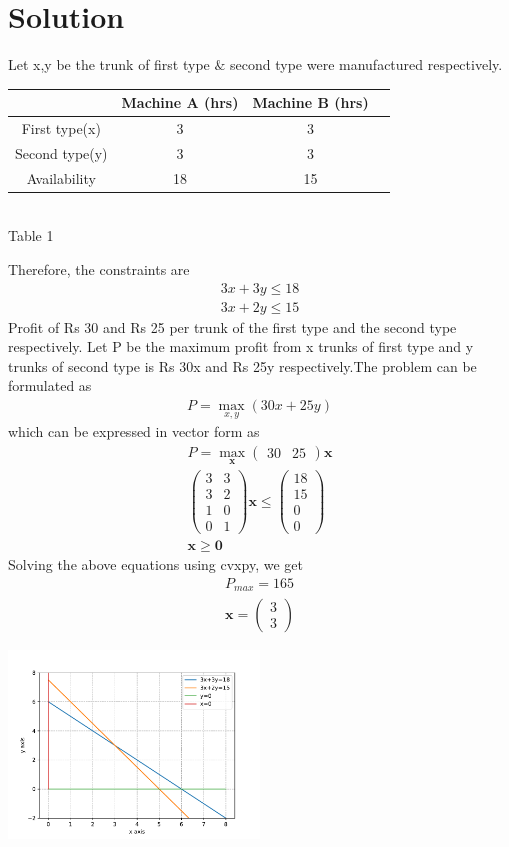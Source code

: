 \documentclass[10pt,twocolumn]{article}
\let\vec\mathbf
\newcommand{\myvec}[1]{\ensuremath{\begin{pmatrix}#1\end{pmatrix}}}
\begin{document}
\section*{\large Solution}
Let x,y be the trunk of first type $\&$ second type were manufactured respectively.
\begin{center}
    \setlength{\arrayrulewidth}{0.1mm}
	\setlength{\tabcolsep}{2pt}
	\renewcommand{\arraystretch}{2}
\begin{tabular}{|c|c|c|c|}
	\hline 
    \textbf{} & \textbf{Machine A (hrs)} & \textbf{Machine B (hrs)} \\ \hline
    First type(x) & 3 &  3 \\ \hline
    Second type(y) & 3 & 3\\ \hline
     Availability & 18 & 15\\ \hline
\end{tabular}\\ \vspace{2mm}
\hspace{1cm} Table 1
\end{center}
Therefore, the constraints are
\begin{align}
3x + 3y \leq 18 \\
3x + 2y \leq 15
\end{align}
Profit of Rs 30 and Rs 25 per trunk of the first type and the second type respectively. Let P be the maximum profit from x trunks of first type and y trunks of second type is Rs 30x and Rs 25y respectively.The problem can be formulated as
\begin{align}
	P = \max_{x,y}(30x+25y)
\end{align}
which can be expressed in vector form as
\begin{align}
	P = \max_{\vec{x}}\myvec{30&25}\vec{x}\\
	\myvec{3 & 3 \\ 3 & 2 \\ 1 & 0\\0&1}\vec{x} \leq \myvec{18 \\ 15\\0\\0}\\
	\vec{x} \geq \vec{0}
\end{align}
Solving the above equations using cvxpy, we get
\begin{align}
	P_{max} = 165\\
	\vec{x} = \myvec{3 \\ 3}
\end{align}
\begin{center}
 \includegraphics[width=0.5\textwidth]{opt1.pdf}  
 \end{center}\vspace{1mm}
\end{document}
